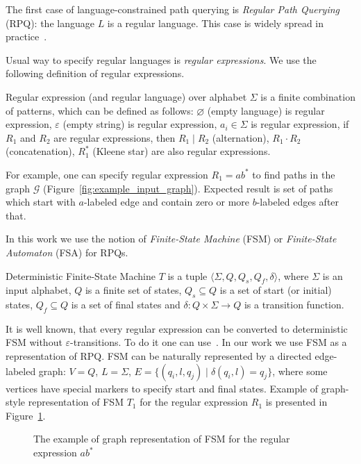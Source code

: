 The first case of language-constrained path querying is \textit{Regular Path Querying} (RPQ): the language $L$ is a regular language. This case is widely spread in practice~\cite{!!!}.

Usual way to specify regular languages is \textit{regular expressions}.
We use the following definition of regular expressions.
\begin{definition}
Regular expression (and regular language) over alphabet $\Sigma$ is a finite combination of patterns, which can be defined as follows: $\varnothing$ (empty language) is regular expression, $\varepsilon$ (empty string) is regular expression, $a_i \in \Sigma$ is regular expression, if $R_1$ and $R_2$ are regular expressions, then $R_1 \mid R_2$ (alternation), $R_1 \cdot R_2$ (concatenation), $R_1^*$ (Kleene star) are also regular expressions.
\end{definition}

For example, one can specify regular expression $R_1 = ab^*$ to find paths in the graph $\mathcal{G}$ (Figure~\ref{fig:example_input_graph}). Expected result is set of paths which start with $a$-labeled edge and contain zero or more $b$-labeled edges after that.

In this work we use the notion of \textit{Finite-State Machine} (FSM) or \textit{Finite-State Automaton} (FSA) for RPQs.

\begin{definition}
Deterministic Finite-State Machine $T$ is a tuple $\langle \Sigma, Q, Q_s, Q_f, \delta \rangle$, where $\Sigma$ is an input alphabet, $Q$ is a finite set of states, $Q_s \subseteq Q$ is a set of start (or initial) states, $Q_f \subseteq Q$ is a set of final states and $\delta: Q \times \Sigma \to Q$ is a transition function.
\end{definition}

It is well known, that every regular expression can be converted to deterministic FSM without $\varepsilon$-transitions.
To do it one can use~\cite{automata:theory:10.5555/1177300}.
In our work we use FSM as a representation of RPQ.
FSM can be naturally represented by a directed edge-labeled graph: $V = Q$, $L = \Sigma$, $E = \{(q_i,l,q_j) \mid \delta(q_i,l) = q_j\}$, where some vertices have special markers to specify start and final states. Example of graph-style representation of FSM $T_1$ for the regular expression $R_1$ is presented in Figure~\ref{fig:example_fsm}.

\begin{figure}[h]
    \centering
    \caption{The example of graph representation of FSM for the regular expression $ab^*$}
    \label{fig:example_fsm}
\end{figure}

